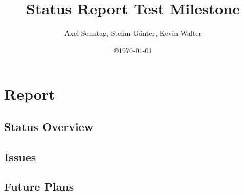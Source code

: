\documentclass[a4paper,12pt]{scrartcl}[1970/01/01]
\title{Status Report Test Milestone}
\author{Axel Sonntag, Stefan Günter, Kevin Walter}
\date{\copyright\space\today}
\begin{document}
\maketitle
\newpage

\tableofcontents
\newpage


\section{Report}

\subsection{Status Overview}


\subsection{Issues}


\subsection{Future Plans}

\end{document}
